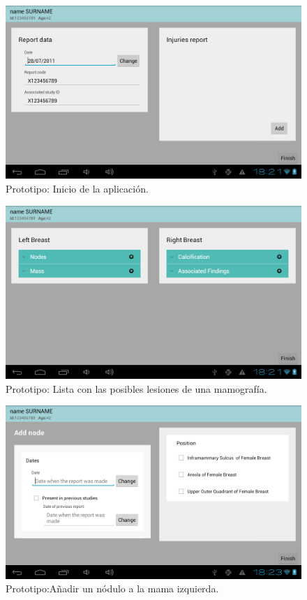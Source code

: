 \begin{figure}[ht]
\centering
\includegraphics[scale=0.4]{./imgs/prototipo/landing.png}
\caption{Prototipo: Inicio de la aplicación.}
\label{fig:prototipo:inicio}
\end{figure}

\begin{figure}[ht]
\centering
\includegraphics[scale=0.4]{./imgs/prototipo/close-tree.png}
\caption{Prototipo: Lista con las posibles lesiones de una mamografía.}
\label{fig:prototipo:tree}
\end{figure}

\begin{figure}[ht]
    \centering
    \includegraphics[scale=0.4]{./imgs/prototipo/addnode.png}
    \caption{Prototipo:Añadir un nódulo a la mama izquierda.}
    \label{fig:prototipo:add}
\end{figure}%


